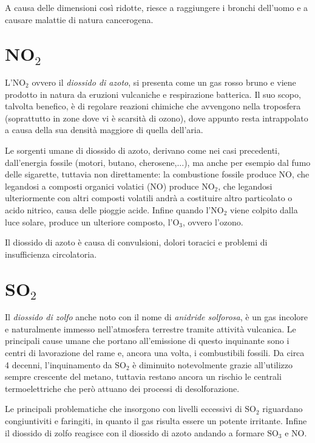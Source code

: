 \documentclass[12pt, letterpaper]{article}
\begin{document}
A causa delle dimensioni così ridotte, riesce a raggiungere i bronchi dell'uomo e a causare malattie di natura cancerogena.

\section{$\textbf{NO}_{2}$}
L'\textit{$\textrm{NO}_{2}$} ovvero il \textit{diossido di azoto}, si presenta come un gas rosso bruno e viene prodotto in natura da eruzioni vulcaniche e respirazione batterica. Il suo scopo, talvolta benefico, è di regolare reazioni chimiche che avvengono nella troposfera (soprattutto in zone dove vi è scarsità di ozono), dove appunto resta intrappolato a causa della sua densità maggiore di quella dell'aria.

Le sorgenti umane di diossido di azoto, derivano come nei casi precedenti, dall'energia fossile (motori, butano, cherosene,...), ma anche per esempio dal fumo delle sigarette, tuttavia non direttamente: la combustione fossile produce \textrm{NO}, che legandosi a composti organici volatici (\textrm{NO}) produce $\textrm{NO}_{2}$, che legandosi ulteriormente con altri composti volatili andrà a costituire altro particolato o acido nitrico, causa delle pioggie acide. Infine quando l'$\textrm{NO}_{2}$ viene colpito dalla luce solare, produce un ulteriore composto, l'$\textrm{O}_{3}$, ovvero l'ozono.

Il diossido di azoto è causa di convulsioni, dolori toracici e problemi di insufficienza circolatoria.

\section{$\textbf{SO}_{2}$}
Il \textit{diossido di zolfo} anche noto con il nome di \textit{anidride solforosa}, è un gas incolore e naturalmente immesso nell'atmosfera terrestre tramite attività vulcanica. Le principali cause umane che portano all'emissione di questo inquinante sono i centri di lavorazione del rame e, ancora una volta, i combustibili fossili. Da circa 4 decenni, l'inquinamento da $\textrm{SO}_{2}$ è diminuito notevolmente grazie all'utilizzo sempre crescente del metano, tuttavia restano ancora un rischio le centrali termoelettriche che però attuano dei processi di desolforazione.

Le principali problematiche che insorgono con livelli eccessivi di $\textrm{SO}_{2}$ riguardano congiuntiviti e faringiti, in quanto il gas risulta essere un potente irritante. Infine il diossido di zolfo reagisce con il diossido di azoto andando a formare $\textrm{SO}_{3}$ e \textrm{NO}.
\end{document}

